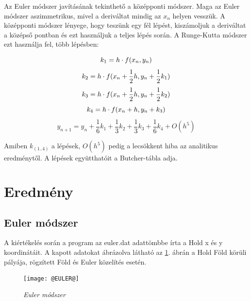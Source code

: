 \documentclass[a4paper, 12pt]{article}
\begin{document}
Az Euler módszer javításának tekinthető a középponti módszer. Maga az Euler módszer aszimmetrikus, mivel a deriváltat mindig az $x_n$ helyen vesszük. A középponti módszer lényege, hogy teszünk egy fél lépést, kiszámoljuk a deriváltat a középső pontban és ezt használjuk a teljes lépés során. A Runge-Kutta módszer ezt használja fel, több lépésben:
\begin{center}
\begin{equation}
k_1=h\cdot f(x_n,y_n)\newline
\end{equation}
\begin{equation}
k_2=h\cdot f(x_n+\frac{1}{2}h,y_n+\frac{1}{2}k_1)\newline
\end{equation}
\begin{equation}
k_3=h\cdot f(x_n+\frac{1}{2}h,y_n+\frac{1}{2}k_2)\newline
\end{equation}
\begin{equation}
k_4=h\cdot f(x_n+h,y_n+k_3)\newline
\end{equation}
\begin{equation}
y_{n+1}=y_n+\frac{1}{6}k_1+\frac{1}{3}k_2+\frac{1}{3}k_3+\frac{1}{6}k_4+O(h^5)
\end{equation}
\end{center}
Amiben $k_{(1..4)}$ a lépések, $O(h^5)$ pedig a lecsökkent hiba az analitikus eredménytől. A lépések együtthatóit a Butcher-tábla adja.

\section{Eredmény}
\label{sec:ered}

\subsection{Euler módszer}
\label{sebsec:euler_2}

A kiértékelés során a program az euler.dat adattömbbe írta a Hold x és y koordinátáit. A kapott adatokat ábrázolva látható az \ref{fig:euler}. ábrán a Hold Föld körüli pályája, rögzített Föld és Euler közelítés esetén.

\begin{figure}
\begin{center}
\texttt{[image: @EULER@]}
  \caption{\textit{Euler módszer}}
\label{fig:euler}
\end{center}
\end{figure}
\end{document}
